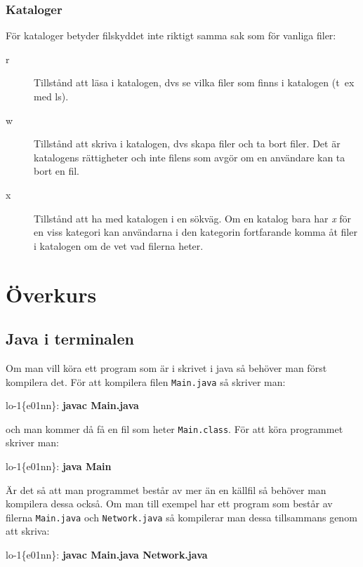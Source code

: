 \documentclass[a4paper,twocolumn]{book}
\begin{document}
\subsection{Kataloger}

För kataloger betyder filskyddet inte riktigt
samma sak som för vanliga filer:
\begin{description}
\item[r] Tillstånd att läsa i katalogen, dvs se vilka filer som finns
  i katalogen (t~ex med ls).
\item[w] Tillstånd att skriva i katalogen, dvs skapa filer och ta bort
  filer. Det är katalogens rättigheter och inte filens som avgör om en
  användare kan ta bort en fil.
\item[x] Tillstånd att ha med katalogen i en sökväg. Om en katalog
  bara har \emph{x} för en viss kategori kan användarna i den
  kategorin fortfarande komma åt filer i katalogen om de vet vad
  filerna heter.
\end{description}


\chapter{Överkurs}
\label{cha:overkurs}

\section{Java i terminalen}
Om man vill köra ett program som är i skrivet i java så behöver man först kompilera det.
För att kompilera filen \texttt{Main.java} så skriver man:
\begin{example}
lo-1\{e01nn\}: \textbf{javac Main.java}
\end{example}
och man kommer då få en fil som heter \texttt{Main.class}.
För att köra programmet skriver man:
\begin{example}
lo-1\{e01nn\}: \textbf{java Main}
\end{example}

Är det så att man programmet består av mer än en källfil
så behöver man kompilera dessa också. Om man till exempel har ett program
som består av filerna \texttt{Main.java} och \texttt{Network.java} så
kompilerar man dessa tillsammans genom att skriva:

\begin{example}
lo-1\{e01nn\}: \textbf{javac Main.java Network.java}
\end{example}
\end{document}
